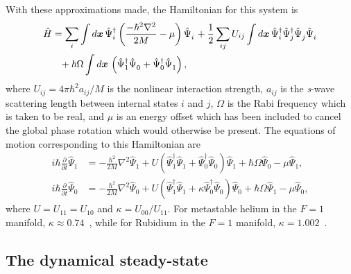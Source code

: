 With these approximations made, the Hamiltonian for this system is
\begin{align}
    \label{Peaks:InitialHamiltonian}
    \begin{split}
    \hat{H} &= \sum_i \int d\vect{x}\, \hat{\Psi}_i^\dagger \left(\frac{-\hbar^2 \nabla^2}{2 M} - \mu\right)\hat{\Psi}_i^{\phantom{\dagger}} + \frac{1}{2} \sum_{i j} U_{i j}\int d\vect{x}\, \hat{\Psi}_i^\dagger \hat{\Psi}_j^\dagger \hat{\Psi}_j^{\phantom{\dagger}} \hat{\Psi}_i^{\phantom{\dagger}}\\
            &\phantom{=} + \hbar \Omega \int d\vect{x}\, \left(\hat{\Psi}_1^\dagger \hat{\Psi}_0^{\phantom{\dagger}} + \hat{\Psi}_0^\dagger \hat{\Psi}_1^{\phantom{\dagger}}\right),
    \end{split}
\end{align}
where $U_{ij} = 4\pi \hbar^2 a_{ij}/M$ is the nonlinear interaction strength, $a_{ij}$ is the \emph{s}-wave scattering length between internal states $i$ and $j$, $\Omega$ is the Rabi frequency which is taken to be real, and $\mu$ is an energy offset which has been included to cancel the global phase rotation which would otherwise be present. The equations of motion corresponding to this Hamiltonian are
\begin{subequations}
    \label{Peaks:OperatorEquationsOfMotion}
    \begin{align}
    i \hbar \frac{\partial }{\partial t}\hat{\Psi}_1  &= -\frac{\hbar^2}{2M}\nabla^2 \hat{\Psi}_1  + U \left(\hat{\Psi}_1^\dagger \hat{\Psi}_1^{\phantom{\dagger}} + \hat{\Psi}_0^\dagger \hat{\Psi}_0^{\phantom{\dagger}}\right) \hat{\Psi}_1 + \hbar \Omega \hat{\Psi}_0 - \mu \hat{\Psi}_1,  \\
    i \hbar \frac{\partial }{\partial t}\hat{\Psi}_0 &= -\frac{\hbar^2}{2M} \nabla^2 \hat{\Psi}_0 + U \left(\hat{\Psi}_1^\dagger \hat{\Psi}_1^{\phantom{\dagger}} + \kappa \hat{\Psi}_0^\dagger \hat{\Psi}_0^{\phantom{\dagger}} \right) \hat{\Psi}_0 + \hbar \Omega \hat{\Psi}_1 - \mu \hat{\Psi}_0,
    \end{align}
\end{subequations}
where $U=U_{11}=U_{10}$ and $\kappa = U_{00}/U_{11}$.  For metastable helium in the $F=1$ manifold, $\kappa \approx 0.74$~\citep{Leo:2001}, while for Rubidium in the $F=1$ manifold, $\kappa = 1.002$~\cite{Kempen:2002,Widera:2006}.

\subsection{The dynamical steady-state}
\label{Peaks:MeanFieldPeriodicity}

